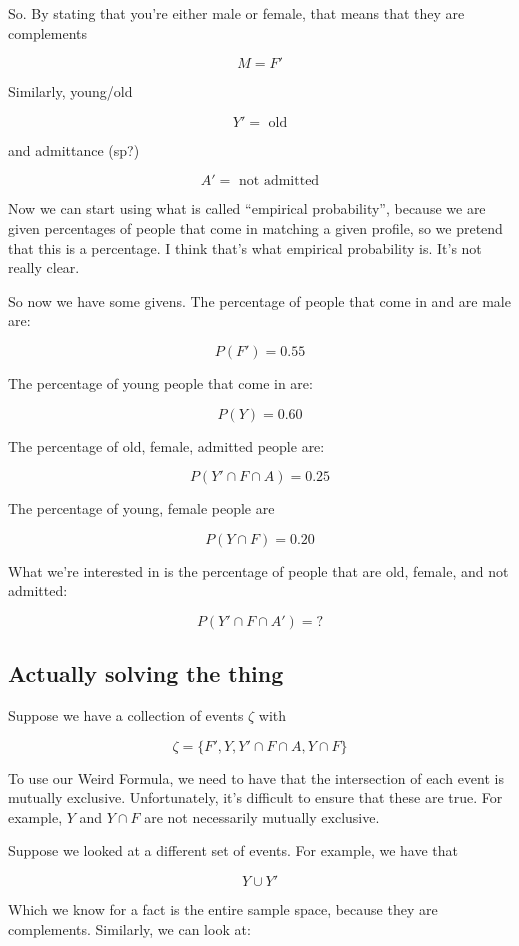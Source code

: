\documentclass{article}
\begin{document}
So. By stating that you're either male or female, that means that they
are complements

\[
M = F'
\]

Similarly, young/old

\[
Y'=\text{ old}
\]

and admittance (sp?)

\[
A'=\text{ not admitted}
\]

Now we can start using what is called ``empirical probability'',
because we are given percentages of people that come in matching a
given profile, so we pretend that this is a percentage. I think that's
what empirical probability is. It's not really clear.

So now we have some givens. The percentage of people that come in and
are male are:

\[
P(F')=0.55
\]

The percentage of young people that come in are:

\[
P(Y)=0.60
\]

The percentage of old, female, admitted people are:

\[
P(Y'\cap F\cap A)=0.25
\]

The percentage of young, female people are

\[
P(Y\cap F)=0.20
\]

What we're interested in is the percentage of people that are old,
female, and not admitted:

\[
P(Y'\cap F\cap A') = ?
\]

\subsection*{Actually solving the thing}

Suppose we have a collection of events $\zeta$ with

\[
\zeta = \{F', Y, Y'\cap F\cap A, Y\cap F\}
\]

To use our Weird Formula\texttrademark, we need to have that the
intersection of each event is mutually exclusive. Unfortunately, it's
difficult to ensure that these are true. For example, $Y$ and
$Y\cap{}F$ are not necessarily mutually exclusive.

Suppose we looked at a different set of events. For example, we have
that

\[
Y\cup Y'
\]

Which we know for a fact is the entire sample space, because they are
complements. Similarly, we can look at:
\end{document}

